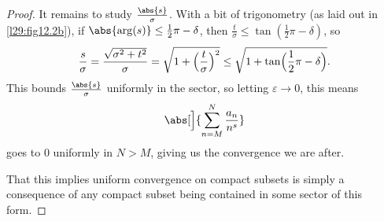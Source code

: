 \begin{proof}
	It remains to study $\frac{\abs{s}}{\sigma}$.
	With a bit of trigonometry (as laid out in \autoref{l29:fig12.2b}), if $\abs{\arg(s)} \leq \frac{1}{2} \pi - \delta$, then $\frac{t}{\sigma} \leq \tan(\frac{1}{2} \pi - \delta)$, so
	\[
		\frac{s}{\sigma} = \frac{\sqrt{\sigma^2 + t^2}}{\sigma} = \sqrt{1 + \Bigl( \frac{t}{\sigma} \Bigr)^2} \leq \sqrt{1 + \tan\Bigl( \frac{1}{2} \pi - \delta \Bigr)}.
	\]
	This bounds $\frac{\abs{s}}{\sigma}$ uniformly in the sector, so letting $\varepsilon \to 0$, this means
	\[
		\abs[\Big]{\sum_{n = M}^N \frac{a_n}{n^s}}
	\]
	goes to $0$ uniformly in $N > M$, giving us the convergence we are after.

	That this implies uniform convergence on compact subsets is simply a consequence of any compact subset being contained in some sector of this form.
\end{proof}
